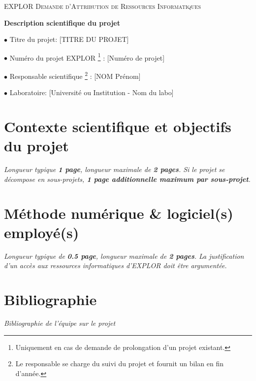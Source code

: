 \documentclass[
    a4paper, 
    12pt, onecolumn,
]{article}
\newcommand{\rubrique}{\bigskip \noindent $\bullet$ }
\begin{document}
\noindent EXPLOR \hfill \textsc{Demande d'Attribution de Ressources Informatiques}

\begin{center}
\Large  \bf
Description scientifique du projet
\end{center}
\bigskip

\rubrique  Titre du projet:  
\hfill
[TITRE DU PROJET]



\rubrique  Num\'ero du projet EXPLOR
\footnote{ Uniquement en cas de demande de prolongation d'un projet
  existant.} : 
\hfill
[Num\'ero de projet]

\rubrique  Responsable scientifique
\footnote{ Le responsable se charge du suivi du projet et fournit un bilan
  en fin d'ann\'ee.} :  
\hfill
[NOM Pr\'enom] 


\rubrique Laboratoire:  
\hfill
[Universit\'e ou Institution - Nom du labo] 


\section{Contexte scientifique et objectifs du projet}

\emph{Longueur typique {\bf 1 page}, longueur maximale de {\bf 2 pages}. Si le projet se d\'ecompose en sous-projets, {\bf 1 page additionnelle maximum par sous-projet}.}
\vskip 0.2cm  

\section{M\'ethode numérique \& logiciel(s) employé(s)}

\emph{Longueur typique de  {\bf 0.5 page}, longueur maximale de {\bf 2 pages}.
La justification d'un accès aux ressources informatiques d'EXPLOR doit être argumentée.}


\section{Bibliographie}
\label{Sec:Biblio}
\emph{Bibliographie de l'équipe sur le projet}



\end{document}

